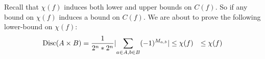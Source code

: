 Recall that $\chi(f)$ induces both lower and upper bounds on $C(f)$.
So if any bound on $\chi(f)$ induces a bound on $C(f)$.
We are about to prove the following lower-bound on $\chi(f)$:
\[\begin{aligned}\text{Disc}(A \times B) 
	& = \frac{1}{2^n * 2^n}\lvert\sum_{a \in A, b \in B} (-1)^{M_{a,b}}\rvert \leq \chi(f)
	& \leq \chi(f)
\end{aligned}\]